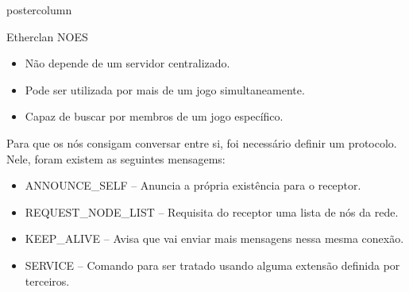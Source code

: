 \documentclass[final]{beamer}
\newlength{\columnheight}
\begin{document}
\begin{frame}
\begin{columns}
    \begin{column}{.5\textwidth}
      \begin{beamercolorbox}[center,wd=\textwidth]{postercolumn}
        \begin{minipage}[T]{.95\textwidth} %
          \parbox[t][\columnheight]{\textwidth}{ %
            
            \vspace*{0.8cm}
            
            \begin{block}{Etherclan}
                NOES
                \begin{itemize}
                  \item Não depende de um servidor centralizado.
                  \item Pode ser utilizada por mais de um jogo simultaneamente.
                  \item Capaz de buscar por membros de um jogo específico.
                \end{itemize}
                
                \vspace*{0.5cm}
                Para que os nós consigam conversar entre si, foi necessário definir um protocolo. 
                Nele, foram existem as seguintes mensagems:
                \begin{itemize}
                  \item ANNOUNCE\_SELF -- Anuncia a própria existência para o receptor.
                  \item REQUEST\_NODE\_LIST -- Requisita do receptor uma lista de nós da rede.
                  \item KEEP\_ALIVE -- Avisa que vai enviar mais mensagens nessa mesma conexão.
                  \item SERVICE -- Comando para ser tratado usando alguma extensão definida por terceiros.
                \end{itemize}
                
                \vspace*{0.2cm}
                

\end{block}}
\end{minipage}
\end{beamercolorbox}
\end{column}
\end{columns}
\end{frame}
\end{document}
